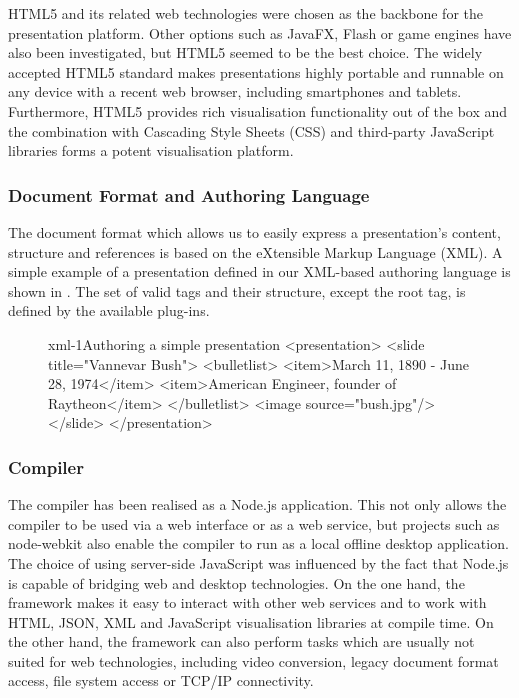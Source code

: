     HTML5 and its related web technologies were chosen as the backbone for
    the \mxp presentation platform. Other options such as JavaFX, Flash or game
    engines have also been investigated, but HTML5 seemed to be the best choice.
    The widely accepted HTML5 standard makes \mxp presentations highly portable and
    runnable on any device with a recent web browser, including smartphones and
    tablets. Furthermore, HTML5 provides rich visualisation functionality out of
    the box and the combination with Cascading Style Sheets
    (CSS) and third-party JavaScript libraries forms a potent visualisation
    platform.

    \subsubsection{Document Format and Authoring Language}

     The \mxp document format which allows us to easily express a
     presentation's content, structure and references is based on the
     eXtensible Markup Language (XML). A simple example of a presentation
     defined in our XML-based authoring language is shown in .
     The set of valid tags and their structure, except the 
     root tag, is defined by the available plug-ins.

     \begin{figure}[h!]
      \begin{lstxml}{xml-1}{Authoring a simple \mxp presentation}
<presentation>
  <slide title="Vannevar Bush">
    <bulletlist>
      <item>March 11, 1890 - June 28, 1974</item>
      <item>American Engineer, founder of Raytheon</item>
    </bulletlist>
    <image source="bush.jpg"/>
  </slide>
</presentation>
      \end{lstxml}
     \end{figure}

    \subsubsection{Compiler}

     The compiler has been realised as a Node.js application. This not only
     allows the compiler to be used via a web interface or as a web service,
     but projects such as node-webkit also enable the compiler to run as a
     local offline desktop application. The choice of using server-side
     JavaScript was influenced by the fact that Node.js is capable of bridging
     web and desktop technologies. On the one hand, the framework makes it easy
     to interact with other web services and to work with HTML, JSON, XML and
     JavaScript visualisation libraries at compile time. On the other hand, the
     framework can also perform tasks which are usually not suited for web
     technologies, including video conversion, legacy document format access,
     file system access or TCP/IP connectivity.

